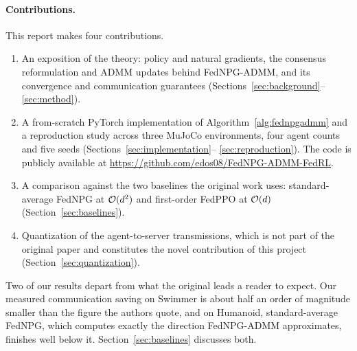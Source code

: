 \paragraph{Contributions.} This report makes four contributions.
\begin{enumerate}
  \item An exposition of the theory: policy and natural gradients, the
        consensus reformulation and ADMM updates behind FedNPG-ADMM, and its
        convergence and communication guarantees
        (Sections~\ref{sec:background}--\ref{sec:method}).
  \item A from-scratch PyTorch implementation of Algorithm~\ref{alg:fednpgadmm}
        and a reproduction study across three MuJoCo environments, four agent
        counts and five seeds (Sections~\ref{sec:implementation}--%
        \ref{sec:reproduction}). The code is publicly available at
        \url{https://github.com/edos08/FedNPG-ADMM-FedRL}.
  \item A comparison against the two baselines the original work uses:
        standard-average FedNPG at $\mathcal{O}(d^2)$ and first-order FedPPO at
        $\mathcal{O}(d)$ (Section~\ref{sec:baselines}).
  \item Quantization of the agent-to-server transmissions, which is not part of
        the original paper and constitutes the novel contribution of this
        project (Section~\ref{sec:quantization}).
\end{enumerate}

Two of our results depart from what the original leads a reader to expect.
Our measured communication saving on Swimmer is about half an order of
magnitude smaller than the figure the authors quote, and on Humanoid,
standard-average FedNPG, which computes exactly the direction FedNPG-ADMM
approximates, finishes well below it. Section~\ref{sec:baselines} discusses
both.
